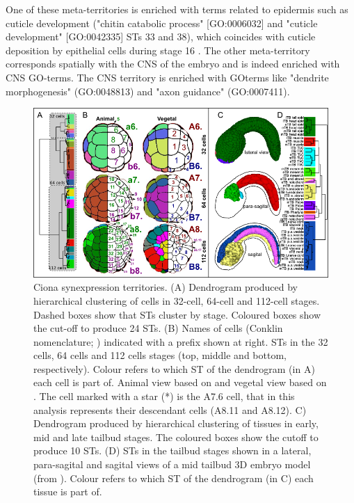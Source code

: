 One of these meta-territories is enriched with terms related to epidermis such as cuticle development ("chitin catabolic process" [GO:0006032] and "cuticle development" [GO:0042335] STs 33 and 38), which coincides with cuticle deposition by epithelial cells during stage 16 \citep{Ostrowski2002}.
%
The other meta-territory corresponds spatially with the CNS of the embryo and is indeed enriched with CNS GO-terms.
The CNS territory is enriched with GOterms like "dendrite morphogenesis" (GO:0048813) and "axon guidance" (GO:0007411). 
%
\begin{figure}[!t]
  \includegraphics[width=\textwidth]{./Images/Art-II/territories.png}
  \centering
  \caption{Ciona synexpression territories. 
  (A) Dendrogram produced by hierarchical clustering of cells in 32-cell, 64-cell and 112-cell stages. Dashed boxes show that STs cluster by stage. Coloured boxes show the cut-off to produce 24 STs.
  (B) Names of cells (Conklin nomenclature; \citealp{Conklin1905}) indicated with a prefix shown at right. STs in the 32 cells, 64 cells and 112 cells stages (top, middle and bottom, respectively). Colour refers to which ST of the dendrogram (in A) each cell is part of. Animal view based on \citet{Nicol1988} and vegetal view based on \citet{Cole2004a}. The cell marked with a star (*) is the A7.6 cell, that in this analysis represents their descendant cells (A8.11 and A8.12).
  C) Dendrogram produced by hierarchical clustering of tissues in early, mid and late tailbud stages. The coloured boxes show the cutoff to produce 10 STs. (D) STs in the tailbud stages shown in a lateral, para-sagital and sagital views of a mid tailbud 3D embryo model (from \citealp{Nakamura2012}). Colour refers to which ST of the dendrogram (in C) each tissue is part of.
}
  \label{fig:Art-II-territories}
\end{figure}

